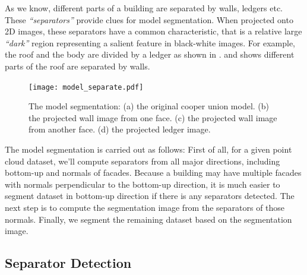 
As we know, different parts of a building are separated by walls, ledgers etc. 
These {\it ``separators''} provide clues for model segmentation. 
When projected onto 2D images, these separators have a common characteristic, 
that is a relative large {\it ``dark''} region representing a salient feature in black-white images.
For example, the roof and the body are divided by a ledger as shown in .
 and  shows different parts of the roof are separated by walls.


\begin{figure}[htbp]
  \centering
  \texttt{[image: model\_separate.pdf]}
      \caption{The model segmentation: 
      (a) the original cooper union model.
      (b) the projected wall image from one face.
      (c) the projected wall image from another face.
      (d) the projected ledger image.}
      \label{fig:MS_Fig1}
\end{figure}

The model segmentation is carried out as follows:
First of all, for a given point cloud dataset, we'll compute separators from all major directions, 
including bottom-up and normals of facades. 
Because a building may have multiple facades with normals perpendicular to the bottom-up direction,
it is much easier to segment dataset in bottom-up direction if there is any separators detected.
The next step is to compute the segmentation image from the separators of those normals.
Finally, we segment the remaining dataset based on the segmentation image.

\subsection{Separator Detection}
\label{sec:sd}

